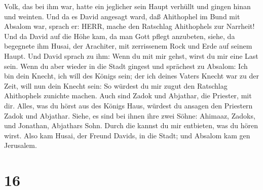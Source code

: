 Volk, das bei ihm war, hatte ein jeglicher sein Haupt verhüllt und
gingen hinan und weinten.  Und da es David angesagt ward,
daß Ahithophel im Bund mit Absalom war, sprach er: HERR, mache den
Ratschlag Ahithophels zur Narrheit!  Und da David auf die
Höhe kam, da man Gott pflegt anzubeten, siehe, da begegnete ihm Husai,
der Arachiter, mit zerrissenem Rock und Erde auf seinem Haupt.
 Und David sprach zu ihm: Wenn du mit mir gehst, wirst du
mir eine Last sein.  Wenn du aber wieder in die Stadt
gingest und sprächest zu Absalom: Ich bin dein Knecht, ich will des
Königs sein; der ich deines Vaters Knecht war zu der Zeit, will nun dein
Knecht sein: So würdest du mir zugut den Ratschlag Ahithophels zunichte
machen.  Auch sind Zadok und Abjathar, die Priester, mit
dir. Alles, was du hörst aus des Königs Haus, würdest du ansagen den
Priestern Zadok und Abjathar.  Siehe, es sind bei ihnen
ihre zwei Söhne: Ahimaaz, Zadoks, und Jonathan, Abjathars Sohn. Durch
die kannst du mir entbieten, was du hören wirst.  Also kam
Husai, der Freund Davids, in die Stadt; und Absalom kam gen Jerusalem.

\hypertarget{section-15}{%
\section{16}\label{section-15}}

